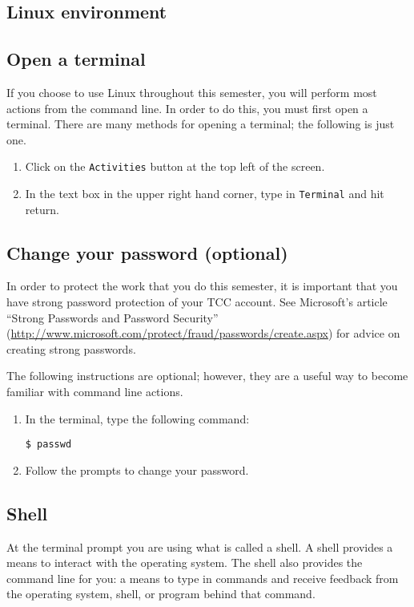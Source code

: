 \documentclass[12pt,hidelinks]{article}
\begin{document}
\begin{appendices}
  \section{Linux environment}
  \label{sec:linux}

\subsection{Open a terminal}

If you choose to use Linux throughout this semester, you will perform most
actions from the command line. In order to do this, you must first open a
terminal. There are many methods for opening a terminal; the following is just
one.

\begin{enumerate}
\item Click on the \texttt{Activities} button at the top left of the screen.
\item In the text box in the upper right hand corner, type in
  \texttt{Terminal} and hit return.
\end{enumerate}

\subsection{Change your password (optional)}
In order to protect the work that you do this semester, it is important that you
have strong password protection of your TCC account.
See Microsoft's article ``Strong Passwords and Password Security''
(\url{http://www.microsoft.com/protect/fraud/passwords/create.aspx}) for advice
on creating strong passwords.

The following instructions are optional; however, they are a useful way to
become familiar with command line actions.

\begin{enumerate}

\item In the terminal, type the following command:
\begin{lstlisting}[style=bash]
$ passwd
\end{lstlisting}
\item Follow the prompts to change your password.
\end{enumerate}

\subsection{Shell}
At the terminal prompt you are using what is called a shell. A shell
provides a means to interact with the operating system. The shell also provides
the command line for you: a means to type in commands and receive feedback from
the operating system, shell, or program behind that command.


\end{appendices}
\end{document}
